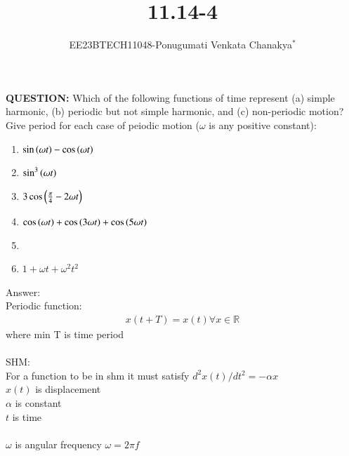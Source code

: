 \documentclass[journal,12pt,twocolumn]{IEEEtran}
\theoremstyle{remark}
\begin{document}
 
 \vspace{3cm}
 \title{\textbf{11.14-4}}
 \author{EE23BTECH11048-Ponugumati Venkata Chanakya$^{*}$%
 }
 \maketitle
 \newpage
 \bigskip
 \renewcommand{\thefigure}{\theenumi}
 \renewcommand{\thetable}{\theenumi}
 \textbf{QUESTION:}
 Which of the following functions of time represent (a) simple harmonic, (b) periodic
 but not simple harmonic, and (c) non-periodic motion? Give period for each case of
 peiodic motion ($\omega$ is any positive constant):\\
 \begin{enumerate}
 \item $\sin\left(\omega t\right)-\cos\left(\omega t\right)$\\
 \item $\sin^3\left(\omega t\right)$\\
 \item $3\cos\left(\frac{\pi}{4}- 2\omega t\right)$\\
 \item $\cos\left(\omega t\right)+\cos\left(3\omega t\right)+\cos\left(5\omega t\right)$\\
 \item {}\\
 \item $1+\omega t+\omega^2 t^2$\\
  \end{enumerate}
 Answer:\\
   Periodic function:
   \begin{align}
x(t+T) = x(t) \forall x \in \mathbb{R}
\end{align}
 where min T is time period\\
 \\
    SHM:\\
    For a function to be in shm it must satisfy 
   $d^2 x(t) / dt^2 = - \alpha x$\\
   $x(t)$ is displacement\\
   $\alpha$ is constant\\
   $t$ is time\\
   \\
    $\omega $ is angular frequency $\omega=2\pi f$\\
\end{document}
